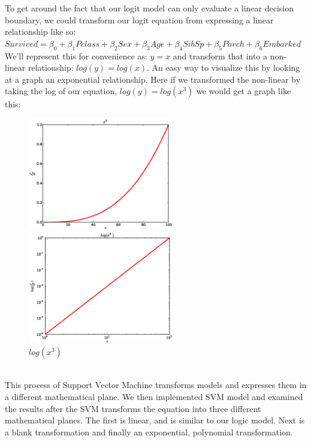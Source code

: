 \documentclass{article}
\begin{document}
To get around the fact that our logit model can only evaluate a linear decision boundary, we could transform our logit equation from expressing a linear relationship like so:\\

{\centering
$Survived=\beta_0+\beta_1Pclass+\beta_2Sex+\beta_3Age+\beta_4SibSp+\beta_5Parch+\beta_6Embarked$}\\

We'll represent this for convenience as: $y=x$ and transform that into a non-linear relationship: $log(y)=log(x)$. An easy way to visualize this by looking at a graph an exponential relationship. Here if we transformed the non-linear by taking the log of our equation, $log(y)=log(x^3)$ we would get a graph like this: 
\\
\begin{figure}[ht]
\begin{minipage}[b]{0.45\linewidth}
\centering
\includegraphics[width=2.5in]{eps/X^3.eps}
\caption{$x^3$}
\label{fig:figure1}
\end{minipage}
\hspace{0.2cm}
\begin{minipage}[b]{0.45\linewidth}
\centering
\includegraphics[width=2.5in]{eps/log_X^3.eps}
\caption{$log(x^3)$}
\label{fig:figure2}
\end{minipage}
\end{figure}
\\

This process of Support Vector Machine transforms models and expresses them in a different mathematical plane. We then implemented SVM model and examined the results after the SVM transforms the equation into three different mathematical planes. The first is linear, and is similar to our logic model. Next is a blank transformation and finally an exponential, polynomial transformation.\\
\end{document}
